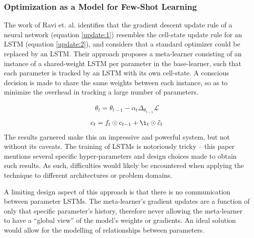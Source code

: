\documentclass{report}
\begin{document}
	\subsubsection{Optimization as a Model for Few-Shot Learning}
	The work of Ravi et. al. \parencite{oaamffsl} identifies that the gradient descent update rule of a neural network (equation \ref{update:1}) resembles the cell-state update rule for an LSTM (equation \ref{update:2}), and considers that a standard optimizer could be replaced by an LSTM. Their approach proposes a meta-learner consisting of an instance of a shared-weight LSTM per parameter in the base-learner, such that each parameter is tracked by an LSTM with its own cell-state. A conscious decision is made to share the same weights between each instance, so as to minimize the overhead in tracking a large number of parameters. \par
	\begin{align} \label{update:1}
	\theta_{t} = \theta_{t-1}-\alpha_{t}\Delta_{\theta_{t-1}}\mathcal{L}
	\end{align}
	\begin{align} \label{update:2}
	c_{t} = f_{t}\odot c_{t-1}+\i_{t}\odot \tilde{c}_t
	\end{align}
	The results garnered make this an impressive and powerful system, but not without its caveats. The training of LSTMs is notoriously tricky -- this paper mentions several specific hyper-parameters and design choices made to obtain such results. As such, difficulties would likely be encountered when applying the technique to different architectures or problem domains. \par
	A limiting design aspect of this approach is that there is no communication between parameter LSTMs. The meta-learner's gradient updates are a function of only that specific parameter's history, therefore never allowing the meta-learner to have a ``global view'' of the model's weights or gradients. An ideal solution would allow for the modelling of relationships between parameters. \par 
	
\end{document}
